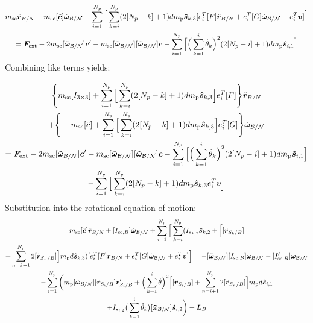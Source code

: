 \begin{multline}
	m_{\textnormal{sc}} \ddot{\bm r}_{B/N}-m_{\textnormal{sc}} [\tilde{\bm{c}}]\dot{\bm\omega}_{\cal B/N}+\sum^{N_p}_{i=1} \Big[ \sum^{N_p}_{k=i} (2[N_p-k]+1) d m_{\text{p}} \bm{\hat{s}}_{k,3} [e_{i}^T[F] \ddot{\bm r}_{B/N} + e_{i}^T[G]\dot{\bm\omega}_{\cal B/N} + e_{i}^T\bm v] \Big] \\
	= \bm F_{\textnormal{ext}} - 2 m_{\textnormal{sc}} [\tilde{\bm\omega}_{\cal B/N}]\bm{c}'
	- m_{\textnormal{sc}} [\tilde{\bm\omega}_{\cal B/N}][\tilde{\bm\omega}_{\cal B/N}]\bm{c}-\sum^{N_p}_{i=1} \Big[ \Big(\sum^{i}_{k=1}\dot{\theta}_k\Big)^2 (2[N_p-i]+1) d m_{\text{p}} \bm{\hat{s}}_{i,1} \Big]
	\label{eq:Rbddot5}
\end{multline}
Combining like terms yields:

\begin{multline}
	\Bigg \lbrace m_{\textnormal{sc}}[I_{3\times 3}] + \sum^{N_p}_{i=1} \Big[\sum^{N_p}_{k=i} (2[N_p-k]+1) d m_{\text{p}} \bm{\hat{s}}_{k,3}\Big] e_{i}^T[F] \Bigg \rbrace \ddot{\bm r}_{B/N} 
	\\
	+ \Bigg \lbrace -m_{\textnormal{sc}} [\tilde{\bm{c}}]  + \sum^{N_p}_{i=1} \Big[\sum^{N_p}_{k=i} (2[N_p-k]+1) d m_{\text{p}} \bm{\hat{s}}_{k,3}\Big] e_{i}^T[G]\Bigg \rbrace \dot{\bm\omega}_{\cal B/N}\\
	=  \bm F_{\textnormal{ext}} - 2 m_{\textnormal{sc}} [\tilde{\bm\omega}_{\cal B/N}]\bm{c}'
	- m_{\textnormal{sc}} [\tilde{\bm\omega}_{\cal B/N}][\tilde{\bm\omega}_{\cal B/N}]\bm{c}-\sum^{N_p}_{i=1} \Big[ \Big(\sum^{i}_{k=1}\dot{\theta}_k\Big)^2 (2[N_p-i]+1) d m_{\text{p}} \bm{\hat{s}}_{i,1} \Big]\\
	- \sum^{N_p}_{i=1} \Big[\sum^{N_p}_{k=i} (2[N_p-k]+1) d m_{\text{p}} \bm{\hat{s}}_{k,3} e_{i}^T \bm v \Big]
	\label{eq:Rbddot6}
\end{multline}
Substitution into the rotational equation of motion:
\begin{multline}
	m_{\text{sc}}[\tilde{\bm{c}}]\ddot{\bm r}_{B/N} + [I_{\text{sc},B}] \dot{\bm\omega}_{\cal B/N} + \sum\limits_{i=1}^{N_p} \Big[ \sum^{N_p}_{k=i} (I_{s_{k,2}} \bm{\hat{s}}_{k,2} + \Big[ [\tilde{{\bm r}}_{S_{k}/B}] \\
	+ \sum\limits_{n=k+1}^{N_p}2[\tilde{{\bm r}}_{S_{n}/B}]\Big]m_{\text{p}} d \bm{\hat{s}}_{k,3} ) [e_{i}^T[F] \ddot{\bm r}_{B/N} + e_{i}^T[G]\dot{\bm\omega}_{\cal B/N} + e_{i}^T\bm v]\Big]
	= -[\bm{\tilde{\omega}}_{\cal B/N}] [I_{\text{sc},B}] \bm\omega_{\cal B/N} - [I'_{\text{sc},B}] \bm\omega_{\cal B/N} \\
	- \sum\limits_{i=1}^{N_p}\bigg( m_{\text{p}} [\tilde{\bm\omega}_{\cal B/N}] [\tilde{{\bm r}}_{S_{i}/B}] \bm{r}'_{S_i/B} + \Big( \sum\limits_{k=1}^{i} \dot{\theta}\Big)^2 \Big[[\tilde{{\bm r}}_{S_{i}/B}] + \sum\limits_{n=i+1}^{N_p}2[\tilde{{\bm r}}_{S_{n}/B}]\Big] m_{\text{p}} d \bm{\hat{s}}_{i,1}\\
	+ I_{s_{i,2}} \big(\sum^{i}_{k=1}\dot{\theta}_k\big) [\bm{\tilde{\omega}}_{\cal B/N}] \bm{\hat{s}}_{i,2} \bigg) + \bm L_B
	\label{eq:Final7sub}
\end{multline}
